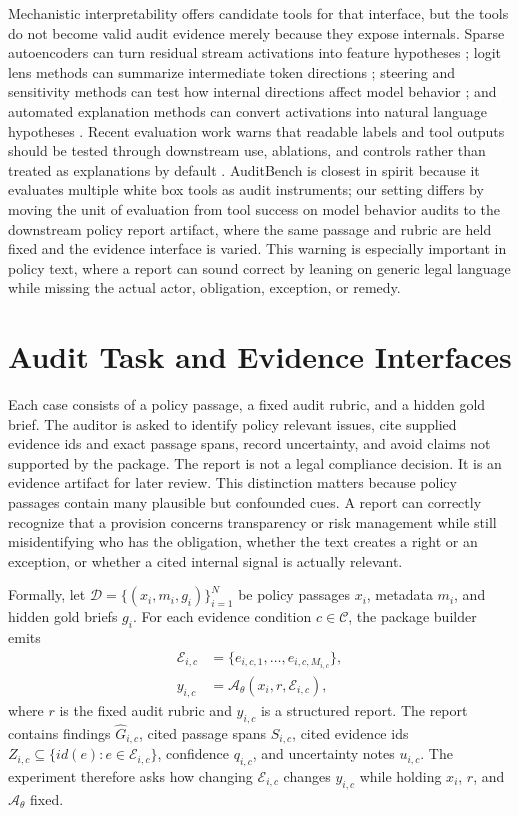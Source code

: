 \documentclass{article}
\newcommand{\dataset}{\mathcal{D}}
\newcommand{\conditions}{\mathcal{C}}
\newcommand{\package}{\mathcal{E}}
\newcommand{\auditor}{\mathcal{A}_{\theta}}
\begin{document}
Mechanistic interpretability offers candidate tools for that interface, but the tools do not become valid audit evidence merely because they expose internals. Sparse autoencoders can turn residual stream activations into feature hypotheses \citep{cunningham2024sae,bricken2023monosemanticity,templeton2024scaling,lieberum2024gemmascope}; logit lens methods can summarize intermediate token directions \citep{belrose2023tunedlens}; steering and sensitivity methods can test how internal directions affect model behavior \citep{cyberey2026steering}; and automated explanation methods can convert activations into natural language hypotheses \citep{bills2023neurons,activationoracles2025}. Recent evaluation work warns that readable labels and tool outputs should be tested through downstream use, ablations, and controls rather than treated as explanations by default \citep{karvonen2025saebench,sheshadri2026auditbench}. AuditBench is closest in spirit because it evaluates multiple white box tools as audit instruments; our setting differs by moving the unit of evaluation from tool success on model behavior audits to the downstream policy report artifact, where the same passage and rubric are held fixed and the evidence interface is varied. This warning is especially important in policy text, where a report can sound correct by leaning on generic legal language while missing the actual actor, obligation, exception, or remedy.

\section{Audit Task and Evidence Interfaces}

Each case consists of a policy passage, a fixed audit rubric, and a hidden gold brief. The auditor is asked to identify policy relevant issues, cite supplied evidence ids and exact passage spans, record uncertainty, and avoid claims not supported by the package. The report is not a legal compliance decision. It is an evidence artifact for later review. This distinction matters because policy passages contain many plausible but confounded cues. A report can correctly recognize that a provision concerns transparency or risk management while still misidentifying who has the obligation, whether the text creates a right or an exception, or whether a cited internal signal is actually relevant.

Formally, let $\dataset=\{(x_i,m_i,g_i)\}_{i=1}^{N}$ be policy passages $x_i$, metadata $m_i$, and hidden gold briefs $g_i$. For each evidence condition $c\in\conditions$, the package builder emits
\begin{align}
\package_{i,c} &= \{e_{i,c,1},\ldots,e_{i,c,M_{i,c}}\},\\
y_{i,c} &= \auditor(x_i,r,\package_{i,c}),
\end{align}
where $r$ is the fixed audit rubric and $y_{i,c}$ is a structured report. The report contains findings $\hat{G}_{i,c}$, cited passage spans $S_{i,c}$, cited evidence ids $Z_{i,c}\subseteq\{id(e):e\in\package_{i,c}\}$, confidence $q_{i,c}$, and uncertainty notes $u_{i,c}$. The experiment therefore asks how changing $\package_{i,c}$ changes $y_{i,c}$ while holding $x_i$, $r$, and $\auditor$ fixed.
\end{document}

